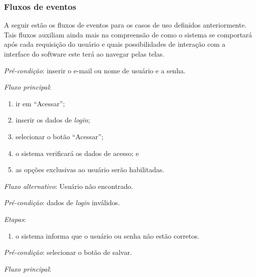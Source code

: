 \newpage

\hspace{2.5cm}
\subsubsection{Fluxos de eventos}
\label{subsubsec:fluxos}
\hspace{2.5cm}

A seguir estão os fluxos de eventos para os casos de uso definidos anteriormente. Tais fluxos auxiliam ainda mais na compreensão de como o sistema se comportará após cada requisição do usuário e quais possibilidades de interação com a interface do software este terá ao navegar pelas telas.

\vspace{0.7cm}

\noindent \textit{Pré-condição}: inserir o e-mail ou nome de usuário e a senha.

\noindent \textit{Fluxo principal}:

\begin{enumerate}
    \item ir em ``Acessar'';
    \item inserir os dados de \textit{login};
    \item selecionar o botão ``Acessar'';
    \item o sistema verificará os dados de acesso; e
    \item as opções exclusivas ao usuário serão habilitadas.
\end{enumerate}

\noindent \textit{Fluxo alternativo}: Usuário não encontrado.

\noindent \textit{Pré-condição}: dados de \textit{login} inválidos.

\noindent \textit{Etapas}:

\begin{enumerate}
    \item o sistema informa que o usuário ou senha não estão corretos.
\end{enumerate}


\vspace{0.7cm}

\noindent \textit{Pré-condição}: selecionar o botão de salvar.

\noindent \textit{Fluxo principal}:

